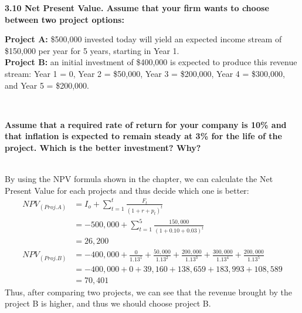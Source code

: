 \documentclass{article}
\begin{document}
    \textbf{3.10 Net Present Value. Assume that your firm wants to choose between two project options:}\\[0.5em]
    \hspace*{0.8cm}
    \begin{minipage}{0.6\textwidth}
        \textbf{Project A:} \$500,000 invested today will yield an expected income stream of \$150,000 per year for 5 years, starting in Year 1.\\[0.5em]
        \textbf{Project B:} an initial investment of \$400,000 is expected to produce this revenue stream: Year 1 = 0, Year 2 = \$50,000, Year 3 = \$200,000, Year 4 = \$300,000, and Year 5 = \$200,000.
    \end{minipage}\\[0.5em]
    \hspace*{0.7cm}
    \begin{minipage}{\textwidth}
        \textbf{Assume that a required rate of return for your company is 10\% and that inflation is expected to remain steady at 3\% for the life of the project. Which is the better investment? Why?}
    \end{minipage}\\[1em]
    By using the NPV formula shown in the chapter, we can calculate the Net Present Value for each projects and thus decide which one is better:
    \begin{align*}
        NPV_(Proj.A) &= I_o + \sum_{t=1}^{t}\frac{F_t}{(1+r+p_t)^t}\\
            &= -500,000 + \sum_{t=1}^{5}\frac{150,000}{(1+0.10+0.03)^{t}}\\
            &= 26,200\\
        NPV_(Proj.B) &= -400,000 + \frac{0}{1.13^1} + \frac{50,000}{1.13^2} + \frac{200,000}{1.13^3} + \frac{300,000}{1.13^4} + \frac{200,000}{1.13^5}\\
                     &= -400,000+0+39,160+138,659+183,993+108,589\\
                     &= 70,401
    \end{align*}
    Thus, after comparing two projects, we can see that the revenue brought by the project B is higher, and thus we should choose project B. \\[1em]
\end{document}
